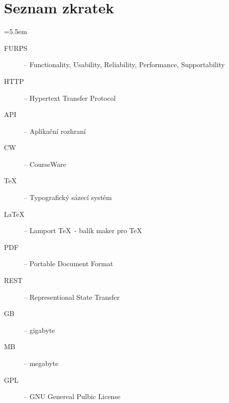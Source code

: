 \appendix

\chapter{Seznam zkratek}

\medskip
\bgroup \leftskip=5.5em

\begin{description}
	
	\item[FURPS] -- Functionality, Usability, Reliability, Performance, Supportability
	
	\item[HTTP] -- Hypertext Transfer Protocol
	
	\item[API] -- Aplikační rozhraní
	
	\item[CW] -- CourseWare
	
	\item[\TeX] -- Typografický sázecí systém
	
	\item[\LaTeX] -- Lamport \TeX\ - balík maker pro \TeX
	
	\item[PDF] -- Portable Document Format
	
	\item[REST] -- Representional State Transfer
	
	\item[GB] -- gigabyte
	
	\item[MB] -- megabyte
	
	\item[GPL] -- GNU Genereal Pulbic License
	
	

\end{description}

\par\egroup